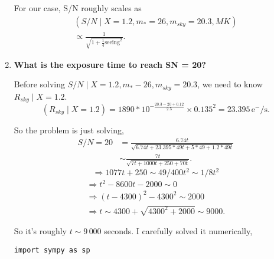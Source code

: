 \documentclass[12pt,letterpaper]{article}
\begin{document}
\begin{enumerate}
    For our case, S/N roughly scales as 
    \begin{equation}
        \begin{split}
            (S/N \mid X=1.2, m_*=26, m_{sky}=20.3, MK)\\
                 \propto \frac{1}{\sqrt{ 1 + \frac{1}{4} \mathrm{seeing}^2 }}.
        \end{split}
    \end{equation}

    \item {\bf What is the exposure time to reach SN = 20?}

    Before solving $ S/N \mid X=1.2, m_{*}-26, m_{sky}=20.3 $, 
    we need to know $ R_{sky} \mid X=1.2 $.
    \begin{equation}
        (R_{sky} \mid X=1.2) = 1890 * 10^{ - \frac{20.3 - 20 + 0.12}{2.5} }
            \times 0.135^2
            = 23.395 \, \mathrm{e^- / s}.
    \end{equation}

    So the problem is just solving,
    \begin{equation}
        \begin{split}
            S/N = 20 
                &= \frac{ 6.74 t }{ \sqrt{ 6.74t + 23.395*49t + 5*49 + 1.2*49t } }\\
                &\sim \frac{7t}{\sqrt{7t + 1000t + 250 + 70t}}.
        \end{split}
    \end{equation}
    \begin{equation*}
        \Rightarrow 1077t + 250 \sim 49 / 400 t^2 \sim 1/8 t^2
    \end{equation*}
    \begin{equation*}
        \begin{split}
            \Rightarrow t^2 - 8600t - 2000 \sim 0\\
            \Rightarrow (t - 4300)^2 - 4300^2 \sim 2000\\
            \Rightarrow t \sim 4300 + \sqrt{ 4300^2 + 2000 } \sim 9000.
        \end{split}
    \end{equation*}

    So it's roughly $t \sim 9\,000$ seconds.  
    I carefully solved it numerically, 

    \begin{lstlisting}[style = python]
    import sympy as sp


\end{lstlisting}
\end{enumerate}
\end{document}
